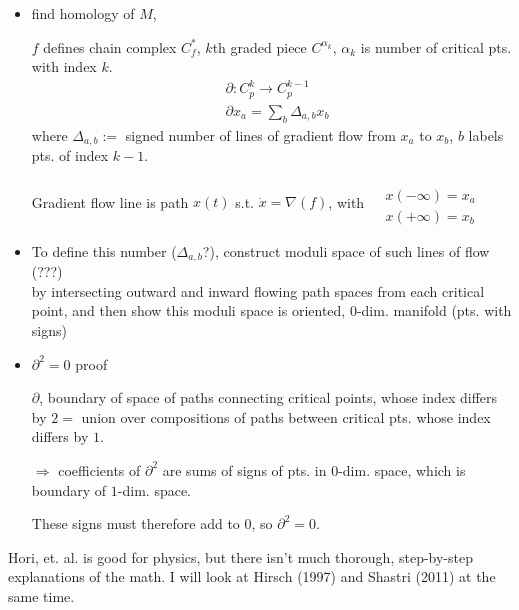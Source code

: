 \documentclass[10pt]{amsart}
\begin{document}
\begin{multicols*}{2}
\begin{itemize}
 
\item find homology of $M$,
  
  $f$ defines chain complex $C_f^*$, $k$th graded piece $C^{\alpha_k}$, $\alpha_k$ is number of critical pts. with index $k$.
  \begin{equation}
\begin{aligned}
  & \partial : C_p^k \to C^{k-1}_p \\ 
  & \partial x_a = \sum_b \Delta_{a,b} x_b 
  \end{aligned}
    \end{equation}
  where $\Delta_{a,b} :=$ signed number of lines of gradient flow from $x_a$ to $x_b$, $b$ labels pts. of index $k-1$.

  Gradient flow line is path $x(t)$ s.t. $\dot{x} = \nabla (f)$, with $\begin{aligned} & \quad  \\
    & x(-\infty) = x_a \\
    & x(+\infty) = x_b \end{aligned}$

\item  To define this number ($\Delta_{a,b} $?), construct moduli space of such lines of flow (???) \\
  by intersecting outward and inward flowing path spaces from each critical point, and then show this moduli space is oriented, 0-dim. manifold (pts. with signs)

\item $\partial^2=0$ proof

  $\partial$, boundary of space of paths connecting critical points, whose index differs by $2 =$ union over compositions of paths between critical pts. whose index differs by $1$.

  $\Longrightarrow$ coefficients of $\partial^2$ are sums of signs of pts. in $0$-dim. space, which is boundary of $1$-dim. space.

  These signs must therefore add to $0$, so $\partial^2=0$.  
  
  \end{itemize}

Hori, et. al. \cite{Hori2003} is good for physics, but there isn't much thorough, step-by-step explanations of the math.  I will look at Hirsch (1997) \cite{MHirsch1997} and Shastri (2011) \cite{AShastri2011} at the same time.  


\end{multicols*}
\end{document}
